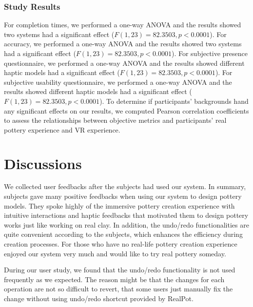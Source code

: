 \documentclass{svjour3}                     %
\begin{document}
\subsubsection{Study Results}
{\color{blue}
For completion times, we performed a one-way ANOVA and the results showed two systems had a significant effect ($F(1, 23) = 82.3503, p < 0.0001$). 
For accuracy, we performed a one-way ANOVA and the results showed two systems had a significant effect ($F(1, 23) = 82.3503, p < 0.0001$). 
For subjective presence questionnaire, we performed a one-way ANOVA and the results showed different haptic models had a significant effect ($F(1, 23) = 82.3503, p < 0.0001$).
For subjective usability questionnaire, we performed a one-way ANOVA and the results showed different haptic models had a significant effect ($F(1, 23) = 82.3503, p < 0.0001$).
To determine if participants' backgrounds hand any significant effects on our results, we computed Pearson correlation coefficients to assess the relationships between objective metrics and participants' real pottery experience and VR experience.
}













\section{Discussions}
\label{sec:discussion}
We collected user feedbacks after the subjects had used our system. In summary, subjects gave many positive feedbacks when using our system to design pottery models. They spoke highly of the immersive pottery creation experience with intuitive interactions and haptic feedbacks that motivated them to design pottery works just like working on real clay. In addition, the undo/redo functionalities are quite convenient according to the subjects, which enhances the efficiency during creation processes. For those who have no real-life pottery creation experience enjoyed our system very much and would like to try real pottery someday. 

During our user study, we found that the undo/redo functionality is not used frequently as we expected.
The reason might be that the changes for each operation are not so difficult to revert, that some users just manually fix the change without using undo/redo shortcut provided by RealPot.
\end{document}
